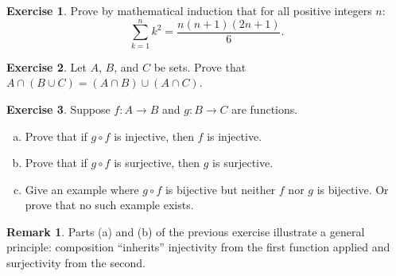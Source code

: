 \documentclass[11pt]{amsart}
\theoremstyle{definition}
\newtheorem{exercise}{Exercise}
\newtheorem*{remark}{Remark}
\begin{document}
\begin{exercise}
Prove by mathematical induction that for all positive integers $n$:
\[
  \sum_{k=1}^{n} k^2 = \frac{n(n+1)(2n+1)}{6}.
\]
\end{exercise}

\begin{exercise}
Let $A$, $B$, and $C$ be sets. Prove that $A \cap (B \cup C) = (A \cap B) \cup (A \cap C)$.
\end{exercise}

\begin{exercise}
Suppose $f \colon A \to B$ and $g \colon B \to C$ are functions.
\begin{enumerate}[(a)]
  \item Prove that if $g \circ f$ is injective, then $f$ is injective.
  \item Prove that if $g \circ f$ is surjective, then $g$ is surjective.
  \item Give an example where $g \circ f$ is bijective but neither $f$ nor $g$ is bijective. Or prove that no such example exists.
\end{enumerate}
\end{exercise}

\begin{remark}
Parts (a) and (b) of the previous exercise illustrate a general principle: composition ``inherits'' injectivity from the first function applied and surjectivity from the second.
\end{remark}
\end{document}
